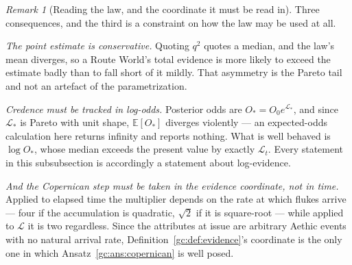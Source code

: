 \documentclass[11pt]{article}
\numberwithin{equation}{section}
\theoremstyle{plain}
\theoremstyle{definition}
\theoremstyle{remark}
\newtheorem{remark}[theorem]{Remark}
\newcommand{\E}{\mathbb{E}}
\newcommand{\Lc}{\mathcal{L}}
\begin{document}
\begin{remark}[Reading the law, and the coordinate it must be read in]
\label{gc:rem:lindy}
Three consequences, and the third is a constraint on how the law may be
used at all.

\emph{The point estimate is conservative.} Quoting $q^{2}$ quotes a
median, and the law's mean diverges, so a Route World's total evidence
is more likely to exceed the estimate badly than to fall short of it
mildly. That asymmetry is the Pareto tail and not an artefact of the
parametrization.

\emph{Credence must be tracked in log-odds.} Posterior odds are
$O_\ast=O_0e^{\Lc_\ast}$, and since $\Lc_\ast$ is Pareto with unit
shape, $\E[O_\ast]$ diverges violently --- an expected-odds calculation
here returns infinity and reports nothing. What is well behaved is
$\log O_\ast$, whose median exceeds the present value by exactly
$\Lc_t$. Every statement in this subsubsection is accordingly a
statement about log-evidence.

\emph{And the Copernican step must be taken in the evidence coordinate,
not in time.} Applied to elapsed time the multiplier depends on the rate
at which flukes arrive --- four if the accumulation is quadratic,
$\sqrt2$ if it is square-root --- while applied to $\Lc$ it is two
regardless. Since the attributes at issue are arbitrary Aethic events
with no natural arrival rate,
Definition~\ref{gc:def:evidence}'s coordinate is the only one in which
Ansatz~\ref{gc:ans:copernican} is well posed.
\end{remark}
\end{document}
